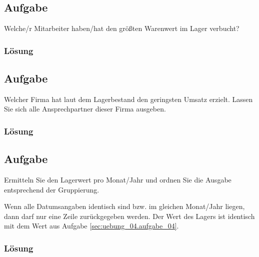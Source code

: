 \subsection{Aufgabe}
\label{sec:uebung_04.aufgabe_07}
Welche/r Mitarbeiter haben/hat den größten Warenwert im Lager verbucht?

\subsubsection*{Lösung}
\label{sec:uebung_04.aufgabe_07.loesung}

\subsection{Aufgabe}
\label{sec:uebung_04.aufgabe_08}
Welcher Firma hat laut dem Lagerbestand den geringsten Umsatz erzielt. Lassen Sie sich alle Ansprechpartner dieser Firma ausgeben.

\subsubsection*{Lösung}
\label{sec:uebung_04.aufgabe_08.loesung}

\subsection{Aufgabe}
\label{sec:uebung_04.aufgabe_09}
Ermitteln Sie den Lagerwert pro Monat/Jahr und ordnen Sie die Ausgabe entsprechend der Gruppierung.

\begin{info-popup}
  Wenn alle Datumsangaben identisch sind bzw. im gleichen Monat/Jahr liegen, dann darf nur eine Zeile zurückgegeben werden. Der Wert des Lagers ist identisch mit dem Wert aus Aufgabe \ref{sec:uebung_04.aufgabe_04}.
\end{info-popup}

\subsubsection*{Lösung}
\label{sec:uebung_04.aufgabe_09.loesung}

